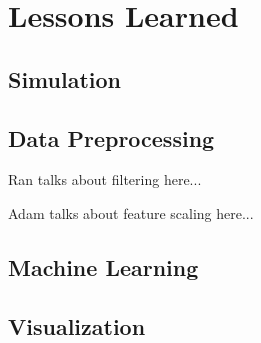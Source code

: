 \section{Lessons Learned}

\subsection{Simulation}


\subsection{Data Preprocessing}

Ran talks about filtering here...

Adam talks about feature scaling here...

\subsection{Machine Learning}

\subsection{Visualization}